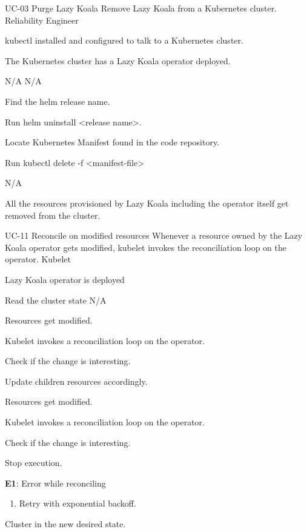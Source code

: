 \UseCaseDescription
{UC-03}
{Purge Lazy Koala}
{Remove Lazy Koala from a Kubernetes cluster.}
{Reliability Engineer}
{\begin{CompactItemizes}
    \item kubectl installed and configured to talk to a Kubernetes cluster.
    \item The Kubernetes cluster has a Lazy Koala operator deployed.
\end{CompactItemizes}}
{N/A}
{N/A}
{\begin{CompactEnumerate}
    \item Find the helm release name.
    \item Run helm uninstall <release name>.
\end{CompactEnumerate}}
{{\begin{CompactEnumerate}
    \item Locate Kubernetes Manifest found in the code repository.
    \item Run kubectl delete -f <manifest-file>
\end{CompactEnumerate}}
{N/A}
{\begin{CompactItemizes}
    \item All the resources provisioned by Lazy Koala including the operator itself get removed from the cluster.
\end{CompactItemizes}}}

\UseCaseDescription
{UC-11}
{Reconcile on modified resources}
{Whenever a resource owned by the Lazy Koala operator gets modified, kubelet invokes the reconciliation loop on the operator.}
{Kubelet}
{\begin{CompactItemizes}
    \item Lazy Koala operator is deployed
\end{CompactItemizes}}
{Read the cluster state}
{N/A}
{\begin{CompactEnumerate}
    \item Resources get modified.
    \item Kubelet invokes a reconciliation loop on the operator.
    \item Check if the change is interesting.
    \item Update children resources accordingly.
\end{CompactEnumerate}}
{{\begin{CompactEnumerate}
    \item Resources get modified.
    \item Kubelet invokes a reconciliation loop on the operator.
    \item Check if the change is interesting.
    \item Stop execution.
\end{CompactEnumerate}}
{\textbf{E1}: Error while reconciling
\vspace{-4mm}\begin{enumerate}
    \item Retry with exponential backoff.
\vspace{-7mm}\end{enumerate}}
{\begin{CompactItemizes}
    \item Cluster in the new desired state.
\end{CompactItemizes}}}